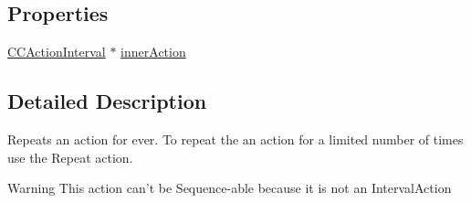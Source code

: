 \subsection*{Properties}
\begin{DoxyCompactItemize}
\item 
\hyperlink{class_c_c_action_interval}{C\-C\-Action\-Interval} $\ast$ \hyperlink{interface_c_c_repeat_forever_a33ab7f675a5d722f903386ab2279ccd1}{inner\-Action}
\end{DoxyCompactItemize}


\subsection{Detailed Description}
Repeats an action for ever. To repeat the an action for a limited number of times use the Repeat action. \begin{DoxyWarning}{Warning}
This action can't be Sequence-\/able because it is not an Interval\-Action 
\end{DoxyWarning}


